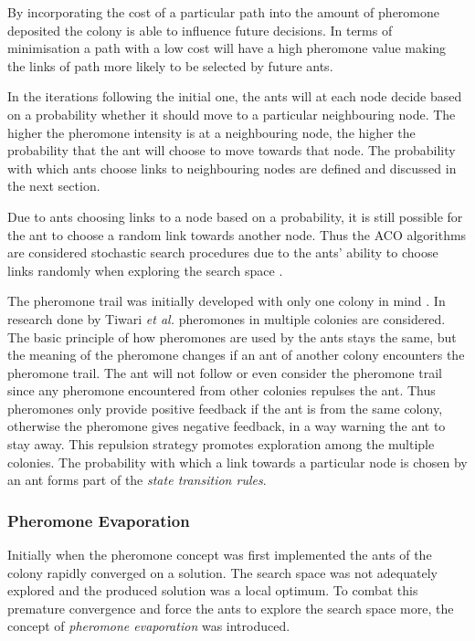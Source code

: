 By incorporating the cost of a particular path into the amount of pheromone deposited the colony is able to influence future decisions\cite{CompuIntelligenceIntro}. In terms of minimisation a path with a low cost will have a high pheromone value making the links of path more likely to be selected by future ants\cite{CompuIntelligenceIntro}.

In the iterations following the initial one, the ants will at each node decide based on a probability whether it should move to a particular neighbouring node. The higher the pheromone intensity is at a neighbouring node, the higher the probability that the ant will choose to move towards that node\cite{AntQAP,AntsAndStigmergy,CompuIntelligenceIntro}. The probability with which ants choose links to neighbouring nodes are defined and discussed in the next section.

Due to ants choosing links to a node based on a probability, it is still possible for the ant to choose a random link towards another node. Thus the \gls{ACO} algorithms are considered stochastic search procedures due to the ants' ability to choose links randomly when exploring the search space \cite{ACOSurvey,ImpACOComplex}.

The pheromone trail was initially developed with only one colony in mind \cite{CompuIntelligenceIntro}. In research done by Tiwari \emph{et al.}\cite{ACOLargeProblem} pheromones in multiple colonies are considered. The basic principle of how pheromones are used by the ants stays the same, but the meaning of the pheromone changes if an ant of another colony encounters the pheromone trail\cite{AntQAP,AntsAndStigmergy,CompuIntelligenceIntro}. The ant will not follow or even consider the pheromone trail since any pheromone encountered from other colonies repulses the ant\cite{ACOLargeProblem}. Thus pheromones only provide positive feedback if the ant is from the same colony, otherwise the pheromone gives negative feedback, in a way warning the ant to stay away\cite{ACOLargeProblem}. This repulsion strategy promotes exploration among the multiple colonies\cite{ACOLargeProblem}. The probability with which a link towards a particular node is chosen by an ant forms part of the \emph{state transition rules}.

\subsubsection{Pheromone Evaporation}
\label{sec:pheromoneevapuation}
Initially when the pheromone concept was first implemented the ants of the colony rapidly converged on a solution\cite{CompuIntelligenceIntro}. The search space was not adequately explored and the produced solution was a local optimum\cite{AntsAndStigmergy}. To combat this premature convergence and force the ants to explore the search space more, the concept of \emph{pheromone evaporation} was introduced\cite{AntIntroTrends,ACOSurvey}. 

